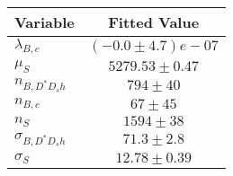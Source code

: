 \begin{tabular}[t]{lc}
\hline
Variable &Fitted Value\\
\hline\hline
$\lambda_{B,c}$&$(-0.0\pm4.7)e-07$\\
\hline
$\mu_S$&$5279.53\pm0.47$\\
\hline
$n_{B, D^* D_s h}$&$794\pm40$\\
\hline
$n_{B,c}$&$67\pm45$\\
\hline
$n_S$&$1594\pm38$\\
\hline
$\sigma_{B, D^* D_s h}$&$71.3\pm2.8$\\
\hline
$\sigma_S$&$12.78\pm0.39$\\
\hline
\end{tabular}